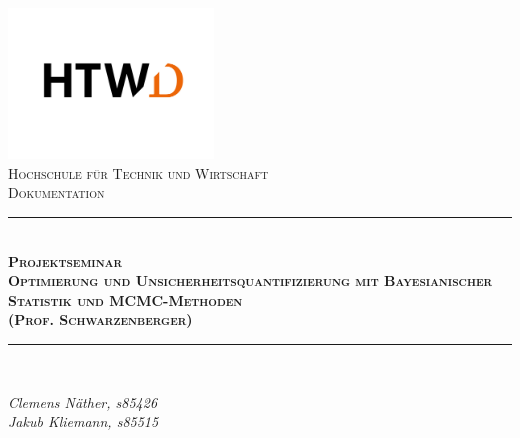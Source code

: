 \documentclass[a4paper,12pt]{article}
\begin{document}
\begin{titlepage}

\begin{center}

\includegraphics[height=4cm]{../images/htwd_logo.jpg}\\[1cm]

\textsc{\LARGE Hochschule für Technik und Wirtschaft}\\[1.5cm]

\textsc{\Large Dokumentation}\\[0.5cm]

\newcommand{\HRule}{\rule{\linewidth}{0.5mm}}
\HRule \\[0.4cm]
{ \huge \bfseries \textsc{Projektseminar}}\\[0.4cm]
{ \huge \bfseries \textsc{Optimierung und Unsicherheitsquantifizierung mit Bayesianischer Statistik und MCMC-Methoden}}\\[0.4cm]
{ \huge \bfseries \textsc{(Prof. Schwarzenberger)}}\\[0.4cm]
\HRule \\[1.5cm]

\begin{minipage}{0.4\textwidth}
\begin{flushleft} \large

\emph{Clemens Näther, s85426}\\
\emph{Jakub Kliemann, s85515}\\

\end{flushleft}
\end{minipage}
\end{center}
\end{titlepage}

\tableofcontents
\newpage
\end{document}
